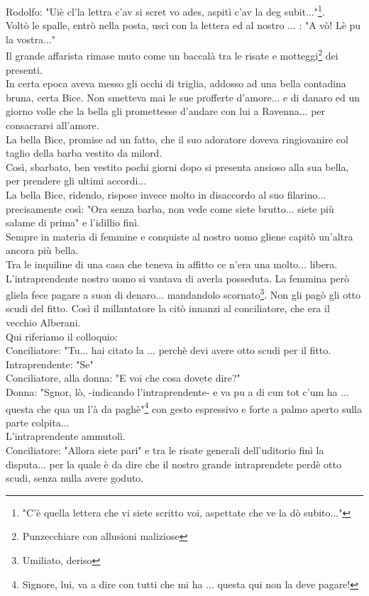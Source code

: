 \documentclass[10pt]{memoir} %
\begin{document}
Rodolfo: "Uiè cl'la lettra c'av si scret vo ades, aspitì c'av la deg subit..."\footnote{"C'è quella lettera che vi siete scritto voi, aspettate che ve la dò subito..."}.\\
Voltò le spalle, entrò nella posta, uscì con la lettera ed al nostro .\:.\:.\: : "A vò! Lè pu la vostra..."\\
Il grande affarista rimase muto come un baccalà tra le risate e motteggi\footnote{Punzecchiare con allusioni maliziose} dei presenti.\\
In certa epoca aveva messo gli occhi di triglia, addosso ad una bella contadina bruna, certa Bice. Non smetteva mai le sue profferte d'amore... e di danaro ed un giorno volle che la bella gli promettesse d'andare con lui a Ravenna... per consacrarsi all'amore.\\
La bella Bice, promise ad un fatto, che il suo adoratore doveva ringiovanire col taglio della barba vestito da milord.\\
Così, sbarbato, ben vestito pochi giorni dopo si presenta ansioso alla sua bella, per prendere gli ultimi accordi...\\
La bella Bice, ridendo, rispose invece molto in disaccordo al suo filarino... precisamente così: "Ora senza barba, non vede come siete brutto... siete più salame di prima" e l'idillio finì.\\
Sempre in materia di femmine e conquiste al nostro uomo gliene capitò un'altra ancora più bella.\\
Tra le inquiline di una casa che teneva in affitto ce n'era una molto... libera. L'intraprendente nostro uomo si vantava di averla posseduta. La femmina però gliela fece pagare a suon di denaro... mandandolo scornato\footnote{Umiliato, deriso}. Non gli pagò gli otto scudi del fitto. Così il millantatore la citò innanzi al conciliatore, che era il vecchio Alberani.\\
Qui riferiamo il colloquio:\\
Conciliatore: "Tu... hai citato la .\:.\:. perchè devi avere otto scudi per il fitto.\\
Intraprendente: "Se"\\
Conciliatore, alla donna: "E voi che cosa dovete dire?"\\
Donna: "Sgnor, lò, -indicando l'intraprendente- e va pu a di cun tot c'um ha .\:.\:. questa che qua un l'à da paghè"\footnote{Signore, lui, va a dire con tutti che mi ha .\:.\:. questa qui non la deve pagare!} con gesto espressivo e forte a palmo aperto sulla parte colpita...\\
L'intraprendente ammutolì.\\
Conciliatore: "Allora siete pari" e tra le risate generali dell'uditorio finì la disputa... per la quale è da dire che il nostro grande intraprendete perdè otto scudi, senza nulla avere goduto. 
\end{document}

